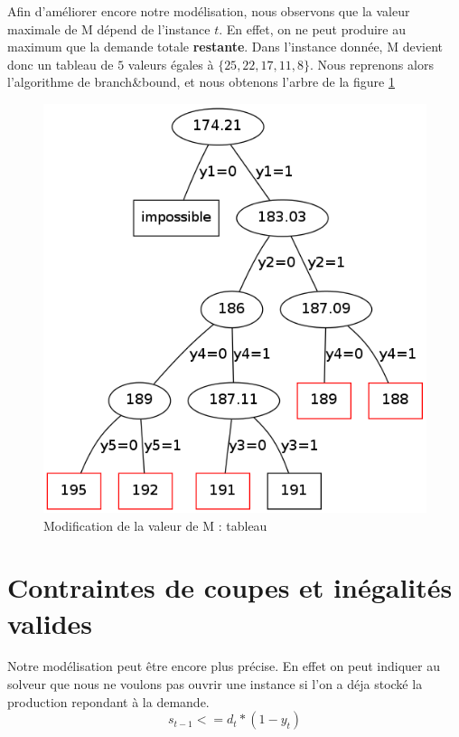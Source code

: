\documentclass[a4paper,11pt,twoside]{report}
\begin{document}
Afin d'améliorer encore notre modélisation, nous observons que la valeur maximale de M dépend de l'instance $t$. En effet, on ne peut produire au maximum que la demande totale \textbf{restante}.
Dans l'instance donnée, M devient donc un tableau de $5$ valeurs égales à $\{25, 22, 17, 11, 8\}$. Nous reprenons alors l'algorithme de branch\&bound, et nous obtenons l'arbre de la figure \ref{graph2}\\
\begin{figure}[h]
 \centering
 \includegraphics[width=\textwidth/2]{graph2.png}
 \caption{Modification de la valeur de M : tableau}
 \label{graph2}
\end{figure}



\section{Contraintes de coupes et inégalités valides}
Notre modélisation peut être encore plus précise. En effet on peut indiquer au solveur que nous ne voulons pas ouvrir une instance si l'on a déja stocké la production repondant à la demande.
\begin{equation}s_{t-1} <= d_{t}*(1-y_{t})\end{equation}
\end{document}
